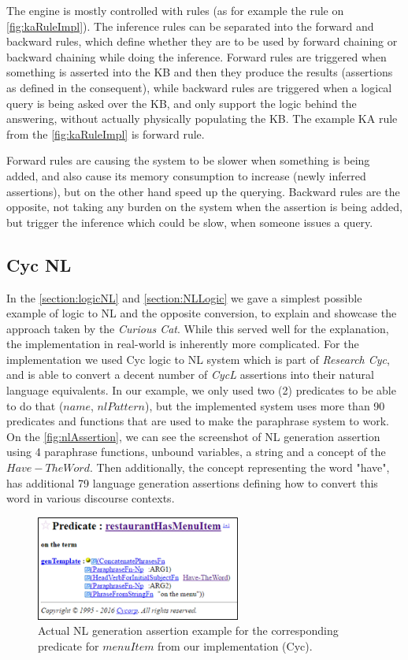 The engine is mostly controlled with rules (as for example the rule on 
\autoref{fig:kaRuleImpl}). The inference rules can be separated
into the forward and backward rules, which define whether they are to be used
by forward chaining or backward chaining while doing the inference. Forward
rules are triggered when something is asserted into the KB and then they produce
the results (assertions as defined in the consequent), while backward rules
are triggered when a logical query is being asked over the KB, and only support
the logic behind the answering, without actually physically populating the KB.
The example KA rule from the \autoref{fig:kaRuleImpl} is forward rule. 

Forward rules are causing the system to be slower when something is being added,
and also cause its memory consumption to increase (newly inferred assertions),
but on the other hand speed up the querying. Backward rules are the opposite,
not taking any burden on the system when the assertion is being added, but
trigger the inference which could be slow, when someone issues a query.

\subsection{Cyc NL}
\label{section:cycnl}
In the \autoref{section:logicNL} and \autoref{section:NLLogic} we gave a 
simplest possible 
example of logic to NL and the opposite conversion, to explain and showcase the
approach taken by the \emph{Curious Cat}. While this served well for the
explanation, the implementation in real-world is inherently more complicated.
For the implementation we used Cyc logic to NL system which is part of 
\emph{Research Cyc}\autocite{Coppock2010,Baxter2005}, and is able to convert
a decent number of \emph{CycL} assertions into their natural language 
equivalents. In our example, we only used two (2) predicates to be able to
do that ($name$, $nlPattern$), but the implemented system uses more than
90 predicates and functions that are used to make the paraphrase system to work.
On the \autoref{fig:nlAssertion}, we can see the screenshot of
NL generation assertion using 4 paraphrase functions, unbound variables,
a string and a concept of the $Have-TheWord$. Then additionally, the concept
representing the word "have", has additional 79 language generation assertions
defining how to convert this word in various discourse contexts. 

\begin{figure}[h]
	\centering
		\includegraphics[width=0.6\textwidth]{figures/nlAssertion.png}
	\caption{Actual NL generation assertion example for the corresponding predicate for 
		$menuItem$ from our implementation (Cyc).}
	\label{fig:nlAssertion}
\end{figure}

